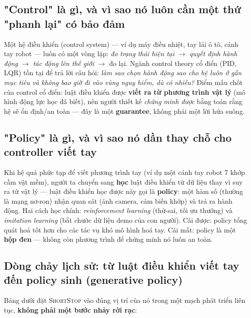 \documentclass[a4paper,12pt]{article}
\newcommand{\st}{\textsc{ShortStop}}
\begin{document}
\subsection{"Control" là gì, và vì sao nó luôn cần một thứ "phanh lại" có bảo đảm}
Một hệ điều khiển (control system) --- ví dụ máy điều nhiệt, tay lái ô tô, cánh tay robot --- luôn có một vòng lặp: \emph{đo trạng thái hiện tại} $\to$ \emph{quyết định hành động} $\to$ \emph{tác động lên thế giới} $\to$ đo lại. Ngành control theory cổ điển (PID, LQR) tồn tại để trả lời câu hỏi: \emph{làm sao chọn hành động sao cho hệ luôn ở gần mục tiêu và không bao giờ đi vào vùng nguy hiểm, dù có nhiễu?} Điểm mấu chốt của control cổ điển: luật điều khiển được \textbf{viết ra từ phương trình vật lý} (mô hình động lực học đã biết), nên người thiết kế \emph{chứng minh được} bằng toán rằng hệ sẽ ổn định/an toàn --- đây là một \textbf{guarantee}, không phải một lời hứa suông.

\subsection{"Policy" là gì, và vì sao nó dần thay chỗ cho controller viết tay}
Khi hệ quá phức tạp để viết phương trình tay (ví dụ một cánh tay robot 7 khớp cầm vật mềm), người ta chuyển sang \textbf{học} luật điều khiển từ dữ liệu thay vì suy ra từ vật lý --- luật điều khiển học được này gọi là \textbf{policy}: một hàm số (thường là mạng nơ-ron) nhận quan sát (ảnh camera, cảm biến khớp) và trả ra hành động. Hai cách học chính: \emph{reinforcement learning} (thử-sai, tối ưu thưởng) và \emph{imitation learning} (bắt chước dữ liệu demo của con người). Cái được: policy tổng quát hoá tốt hơn cho các tác vụ khó mô hình hoá tay. Cái mất: policy là một \textbf{hộp đen} --- không còn phương trình để chứng minh nó luôn an toàn.

\subsection{Dòng chảy lịch sử: từ luật điều khiển viết tay đến policy sinh (generative policy)}
Bảng dưới đặt \st{} vào đúng vị trí của nó trong một mạch phát triển liên tục, \textbf{không phải một bước nhảy rời rạc}:
\end{document}
